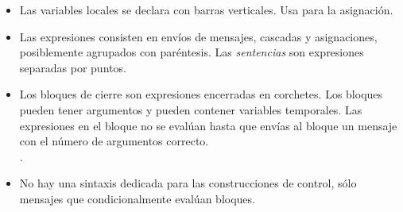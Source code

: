 \documentclass[a4paper,10pt,twoside]{book}
\begin{document}
\begin{itemize}
\item	Las variables locales se declara con barras verticales.
		Usa \ct{:=} para la asignaci\'on.

\item	Las expresiones consisten en env\'ios de mensajes, cascadas y asignaciones, posiblemente agrupados con par\'entesis.
		Las \emph{sentencias} son expresiones separadas por puntos.

\item	Los bloques de cierre son expresiones encerradas en corchetes.
		Los bloques pueden tener argumentos y pueden contener variables temporales.
		Las expresiones en el bloque no se eval\'uan hasta que env\'ias al bloque un mensaje
		 con el n\'umero de argumentos correcto.\\
		.

\item	No hay una sintaxis dedicada para las construcciones de control, s\'olo mensajes que condicionalmente eval\'uan bloques.\\

\end{itemize}

\ifx\wholebook\relax\else
\end{document}

